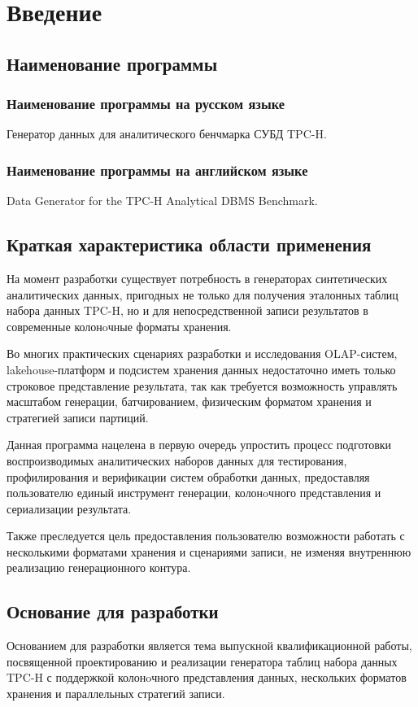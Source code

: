 \section{Введение}

\subsection{Наименование программы}

\subsubsection{Наименование программы на русском языке}

Генератор данных для аналитического бенчмарка СУБД TPC-H.

\subsubsection{Наименование программы на английском языке}

Data Generator for the TPC-H Analytical DBMS Benchmark.

\subsection{Краткая характеристика области применения}

На момент разработки существует потребность в генераторах синтетических аналитических данных, пригодных не только для получения эталонных таблиц набора данных TPC-H, но и для непосредственной записи результатов в современные колонoчные форматы хранения.

Во многих практических сценариях разработки и исследования OLAP-систем, lakehouse-платформ и подсистем хранения данных недостаточно иметь только строковое представление результата, так как требуется возможность управлять масштабом генерации, батчированием, физическим форматом хранения и стратегией записи партиций.

Данная программа нацелена в первую очередь упростить процесс подготовки воспроизводимых аналитических наборов данных для тестирования, профилирования и верификации систем обработки данных, предоставляя пользователю единый инструмент генерации, колонoчного представления и сериализации результата.

Также преследуется цель предоставления пользователю возможности работать с несколькими форматами хранения и сценариями записи, не изменяя внутреннюю реализацию генерационного контура.

\subsection{Основание для разработки}

Основанием для разработки является тема выпускной квалификационной работы, посвященной проектированию и реализации генератора таблиц набора данных TPC-H с поддержкой колонoчного представления данных, нескольких форматов хранения и параллельных стратегий записи.
